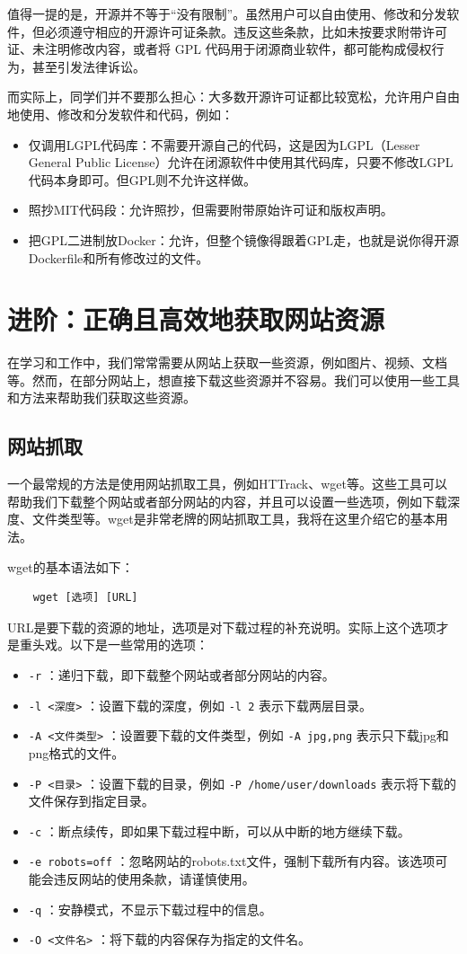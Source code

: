 值得一提的是，开源并不等于“没有限制”。虽然用户可以自由使用、修改和分发软件，但必须遵守相应的开源许可证条款。违反这些条款，比如未按要求附带许可证、未注明修改内容，或者将 GPL 代码用于闭源商业软件，都可能构成侵权行为，甚至引发法律诉讼。

而实际上，同学们并不要那么担心：大多数开源许可证都比较宽松，允许用户自由地使用、修改和分发软件和代码，例如：
\begin{itemize}
  \item 仅调用LGPL代码库：不需要开源自己的代码，这是因为LGPL（Lesser General Public License）允许在闭源软件中使用其代码库，只要不修改LGPL代码本身即可。但GPL则不允许这样做。
  \item 照抄MIT代码段：允许照抄，但需要附带原始许可证和版权声明。
  \item 把GPL二进制放Docker：允许，但整个镜像得跟着GPL走，也就是说你得开源Dockerfile和所有修改过的文件。
\end{itemize}

\section{进阶：正确且高效地获取网站资源}\label{sec:web-get}

在学习和工作中，我们常常需要从网站上获取一些资源，例如图片、视频、文档等。然而，在部分网站上，想直接下载这些资源并不容易。我们可以使用一些工具和方法来帮助我们获取这些资源。

\subsection{网站抓取}

一个最常规的方法是使用网站抓取工具，例如HTTrack、wget等。这些工具可以帮助我们下载整个网站或者部分网站的内容，并且可以设置一些选项，例如下载深度、文件类型等。wget是非常老牌的网站抓取工具，我将在这里介绍它的基本用法。

wget的基本语法如下：
\begin{verbatim}
    wget [选项] [URL]
\end{verbatim}
URL是要下载的资源的地址，选项是对下载过程的补充说明。实际上这个选项才是重头戏。以下是一些常用的选项：
\begin{itemize}
  \item  \texttt{-r} ：递归下载，即下载整个网站或者部分网站的内容。
  \item  \texttt{-l <深度>} ：设置下载的深度，例如 \texttt{-l 2} 表示下载两层目录。
  \item  \texttt{-A <文件类型>} ：设置要下载的文件类型，例如 \texttt{-A jpg,png} 表示只下载jpg和png格式的文件。
  \item  \texttt{-P <目录>} ：设置下载的目录，例如 \texttt{-P /home/user/downloads} 表示将下载的文件保存到指定目录。
  \item  \texttt{-c} ：断点续传，即如果下载过程中断，可以从中断的地方继续下载。
  \item  \texttt{-e robots=off} ：忽略网站的robots.txt文件，强制下载所有内容。该选项可能会违反网站的使用条款，请谨慎使用。
  \item  \texttt{-q} ：安静模式，不显示下载过程中的信息。
  \item  \texttt{-O <文件名>} ：将下载的内容保存为指定的文件名。
\end{itemize}

